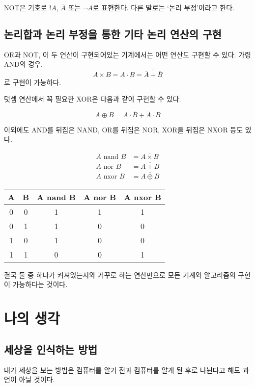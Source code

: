 \documentclass{article}
\begin{document}
NOT은 기호로 $!A$, $\overline A$ 또는 $\neg A$로 표현한다. 다른 말로는 `논리 부정'이라고 한다.

\subsection{논리합과 논리 부정을 통한 기타 논리 연산의 구현}

OR과 NOT, 이 두 연산이 구현되어있는 기계에서는 어떤 연산도 구현할 수 있다. 가령 AND의 경우,
$$A \times B = A \cdot B = \overline{\overline A + \overline B}$$
로 구현이 가능하다.

덧셈 연산에서 꼭 필요한 XOR은 다음과 같이 구현할 수 있다.

$$
A \oplus B = {A} \cdot \overline B + \overline A \cdot B
$$

이외에도 AND를 뒤집은 NAND, OR를 뒤집은 NOR, XOR을 뒤집은 NXOR 등도 있다.

$$
\begin{aligned}
    A \text{ nand } B &= \overline{A \times B} \\
    A \text{ nor } B &= \overline{A + B} \\
    A \text{ nxor } B &= \overline{A \oplus B}
\end{aligned}
$$

\begin{center}
    \begin{tabular}{cc|ccc}
        A & B & A nand B & A nor B & A nxor B \\
        \hline
        0 & 0 & 1 & 1 & 1 \\
        0 & 1 & 1 & 0 & 0 \\
        1 & 0 & 1 & 0 & 0 \\
        1 & 1 & 0 & 0 & 1
    \end{tabular}
\end{center}

결국 둘 중 하나가 켜져있는지와 거꾸로 하는 연산만으로
모든 기계와 알고리즘의 구현이 가능하다는 것이다.

\section{나의 생각}

\subsection{세상을 인식하는 방법}

내가 세상을 보는 방법은 컴퓨터를 알기 전과 컴퓨터를 알게 된 후로 나뉜다고 해도 과언이 아닐 것이다.
\end{document}
